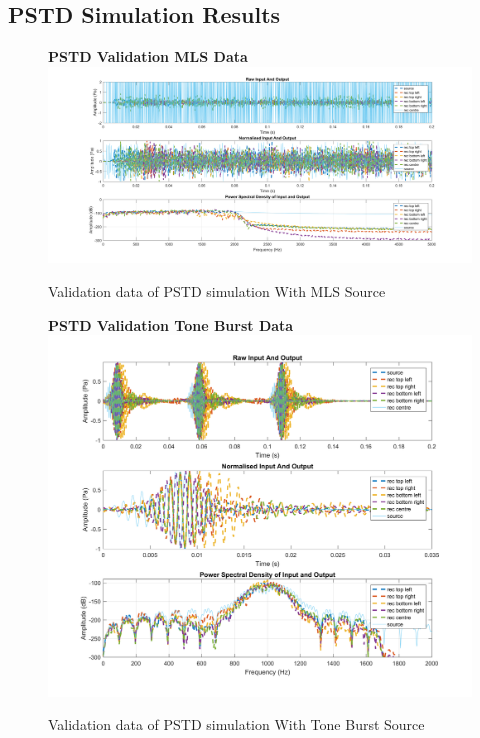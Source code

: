 \subsection{PSTD Simulation Results}
\begin{figure}[H]
\centering
\textbf{PSTD Validation MLS Data}
  \includegraphics[width=\textwidth]{./graphics/PSTDvalidationFinal.png}
  \caption{Validation data of PSTD simulation With MLS Source}
  \end{figure}
  \begin{figure}[H]
  \centering
  \textbf{PSTD Validation Tone Burst Data}
  \includegraphics[width=\textwidth]{./graphics/PSTDvalidationFinalTB.png}
  \caption{Validation data of PSTD simulation With Tone Burst Source}
\end{figure}

